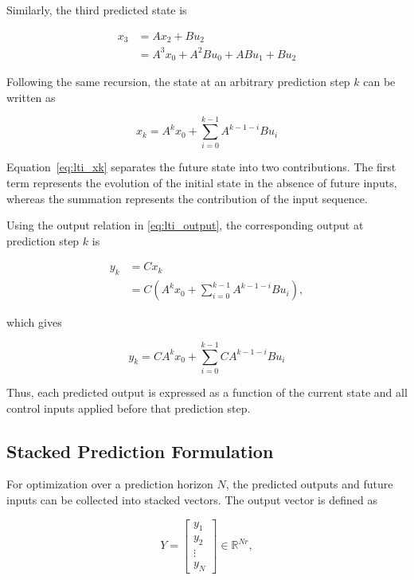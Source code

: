 Similarly, the third predicted state is

\begin{align}
    x_3
    &= Ax_2 + Bu_2 \\
    &= A^3x_0 + A^2Bu_0 + ABu_1 + Bu_2
\end{align}

Following the same recursion, the state at an arbitrary prediction step \(k\) can be written as

\begin{equation}
    x_k
    =
    A^k x_0
    +
    \sum_{i=0}^{k-1}
    A^{k-1-i}B u_i
    \label{eq:lti_xk}
\end{equation}

Equation~\cref{eq:lti_xk} separates the future state into two contributions. The first term represents the evolution of the initial state in the absence of future inputs, whereas the summation represents the contribution of the input sequence.

Using the output relation in \cref{eq:lti_output}, the corresponding output at prediction step \(k\) is

\begin{align}
    y_k
    &= Cx_k \\
    &= C
    \left(
        A^k x_0
        +
        \sum_{i=0}^{k-1}
        A^{k-1-i}Bu_i
    \right),
\end{align}

which gives

\begin{equation}
    y_k
    =
    CA^k x_0
    +
    \sum_{i=0}^{k-1}
    CA^{k-1-i}Bu_i
    \label{eq:lti_yk}
\end{equation}

Thus, each predicted output is expressed as a function of the current state and all control inputs applied before that prediction step.

\subsection{Stacked Prediction Formulation}

For optimization over a prediction horizon \(N\), the predicted outputs and future inputs can be collected into stacked vectors. The output vector is defined as

\begin{equation}
    Y =
    \begin{bmatrix}
        y_1 \\
        y_2 \\
        \vdots \\
        y_N
    \end{bmatrix}
    \in \mathbb{R}^{Nr},
    \label{eq:lti_Y}
\end{equation}

